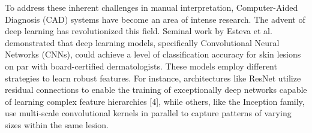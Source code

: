 \noindent 


To address these inherent challenges in manual interpretation, Computer-Aided Diagnosis (CAD) systems have become an area of intense research. The advent of deep learning has revolutionized this field. Seminal work by Esteva et al. \cite{esteva2017dermatologist} demonstrated that deep learning models, specifically Convolutional Neural Networks (CNNs), could achieve a level of classification accuracy for skin lesions on par with board-certified dermatologists. These models employ different strategies to learn robust features. For instance, architectures like ResNet utilize residual connections to enable the training of exceptionally deep networks capable of learning complex feature hierarchies [4], while others, like the Inception family, use multi-scale convolutional kernels in parallel to capture patterns of varying sizes within the same lesion.

